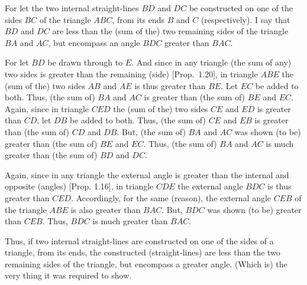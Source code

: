 \begin{Parallel}{}{}
{For let the two internal straight-lines $BD$ and $DC$ be constructed on one of the sides $BC$ of the triangle $ABC$, from its ends $B$ and $C$ (respectively). I say that 
$BD$ and $DC$ are less than the (sum of the) two  remaining sides of the triangle
$BA$ and $AC$, but encompass an angle $BDC$ greater than $BAC$.

\epsfysize=1.5in
\centerline{}

For let $BD$ be drawn through to $E$. And since in any
triangle (the sum of any) two sides is greater than the remaining (side) [Prop.~1.20],
 in triangle $ABE$ the  (sum of the) two sides $AB$ and $AE$ is thus  greater than
$BE$. Let $EC$ be added to both. Thus, (the sum of) $BA$ and $AC$ is greater
than (the sum of) $BE$ and $EC$.  Again, since in triangle $CED$ the (sum of the) two sides $CE$ and $ED$
is  greater than $CD$, let $DB$ be added to both. Thus, 
(the sum of) $CE$ and $EB$ is greater than  (the sum of) $CD$ and $DB$. But, (the sum of) $BA$ and $AC$ was shown
(to be) greater than (the sum of) $BE$
 and $EC$. Thus, (the sum of) $BA$ and $AC$ is much greater than
(the sum of) $BD$ and $DC$.

Again, since in any  triangle the external angle 
is greater than the internal and opposite (angles) [Prop. 1.16],
 in triangle $CDE$ the external angle $BDC$ is thus greater
than $CED$.  Accordingly, for the same (reason),  the external angle $CEB$ of the
triangle $ABE$ is also greater than $BAC$. But, $BDC$ was shown (to be) 
greater
than $CEB$. Thus, $BDC$ is much greater than $BAC$.

Thus, if two internal straight-lines are constructed on one of the sides
of a triangle, from its ends, 
the constructed (straight-lines) are less than the two remaining 
sides of the triangle, but  encompass a greater angle. (Which is) the
very thing it was required to show.}
\end{Parallel}

